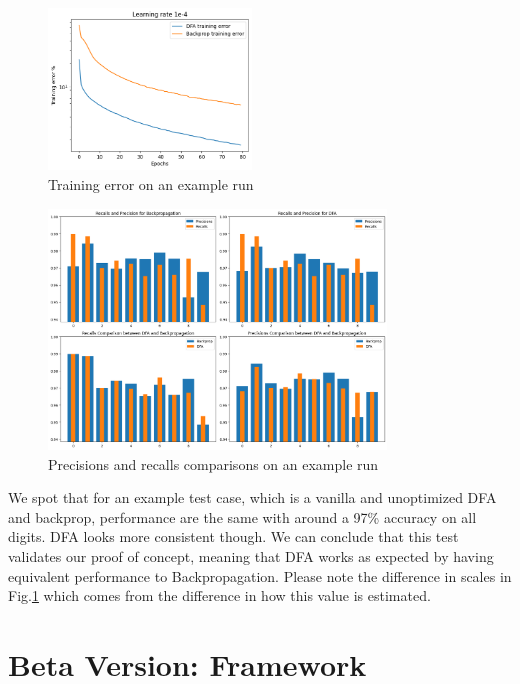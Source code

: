 \documentclass[english]{article}
\begin{document}
\begin{figure}[h!]
  \centering
  \includegraphics[width=0.48\textwidth]{rsc/alpha/TE.png}
  \caption{Training error on an example run}\label{fig:alpha_TE}
\end{figure}

\begin{figure}[H]
  \centering
  \includegraphics[width=0.8\textwidth]{rsc/alpha/precs_recalls.png}
  \caption{Precisions and recalls comparisons on an example run}\label{fig:alpha_precs_rec}
\end{figure}

We spot that for an example test case, which is a vanilla and unoptimized DFA and backprop, performance are the same with around a 97\% accuracy on all digits. DFA looks more consistent though. We can conclude that this test validates our proof of concept, meaning that DFA works as expected by having equivalent performance to Backpropagation. Please note the difference in scales in Fig.\ref{fig:alpha_TE} which comes from the difference in how this value is estimated.




\section{Beta Version: Framework}
\end{document}
